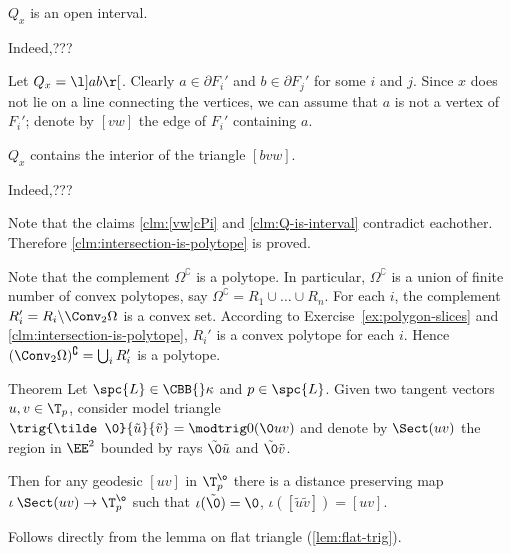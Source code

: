 \begin{clm}{}\label{clm:Q-is-interval}
$Q_x$ is an open interval. 
\end{clm}

Indeed,???\claimqeds

Let $Q_x=\l]ab\r[$.
Clearly $a\in\partial F_i'$ and $b\in\partial F_j'$
for some $i$ and $j$.
Since $x$ does not lie on a line connecting the vertices,
we can assume that $a$ is not a vertex of $F_i'$;
denote by $[vw]$ the edge of $F_i'$ containing $a$.

\begin{clm}{}\label{clm:[vw]cPi}
$Q_x$ contains the interior of the triangle $[bvw]$.
\end{clm}

Indeed,???\claimqeds

Note that the claims \ref{clm:[vw]cPi} and \ref{clm:Q-is-interval} contradict eachother.
Therefore \ref{clm:intersection-is-polytope} is proved.


Note that the complement $\Omega^\complement$ is a polytope.
In particular, $\Omega^\complement$ is a union of finite number of convex polytopes,
say 
$\Omega^\complement=R_1\cup\dots\cup R_n$.
For each $i$, the complement $R_i'=R_i\backslash \Conv_2\Omega$ is a convex set.
According to 
Exercise~\ref{ex:polygon-slices} 
and \ref{clm:intersection-is-polytope}, 
$R_i'$ is a convex polytope for each $i$.
Hence $(\Conv_2\Omega)^\complement=\bigcup_i R_i'$ is a polytope.











\begin{thm}{Theorem}\label{thm:sect}
Let $\spc{L}\in\CBB{}\kappa$ and $p\in \spc{L}$.
Given two tangent vectors $u,v\in \T_p$, consider model triangle $\trig{\tilde \0}{\tilde u}{\tilde v}=\modtrig0(\0 u v)$ 
and denote by $\Sect(u v)$ the region in $\EE^2$ bounded by rays $\tilde \0\tilde u$ and $\tilde \0\tilde v$.

Then for any geodesic $[u v]$ in $\T^\o_p$ there is a distance preserving map $\iota\:\Sect(u v)\to\T^\o_p$ such that $\iota(\tilde \0)=\0$, $\iota([\tilde u\tilde v])=[u v]$.
\end{thm}

Follows directly from the lemma on flat triangle (\ref{lem:flat-trig}).
\qeds






















